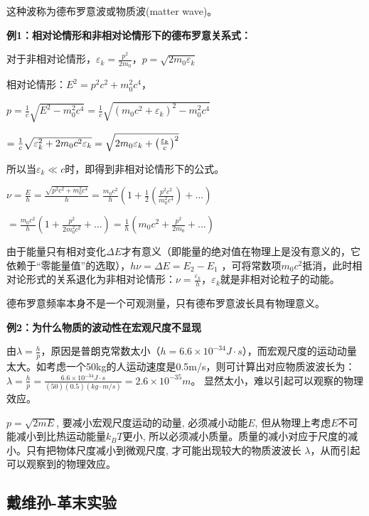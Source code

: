 这种波称为德布罗意波或物质波(matter wave)。

\textbf{例1：相对论情形和非相对论情形下的德布罗意关系式：}

对于非相对论情形，$\varepsilon _k  = \frac{{p^2 }}{{2m_0 }}$，$p = \sqrt {2m_0 \varepsilon _k } $

相对论情形：$E^2  = p^2 c^2  + m_0 ^2 c^4 $，


$p = \frac{1}{c}\sqrt {E^2  - m_0 ^2 c^4 }  = \frac{1}{c}\sqrt
{\left( {m_0 c^2  + \varepsilon _k } \right)^2  - m_0 ^2 c^4 } $

$ = \frac{1}{c}\sqrt {\varepsilon _k ^2  + 2m_0 c^2 \varepsilon _k }
 = \sqrt {2m_0 \varepsilon _k  + \left( {{\textstyle{{\varepsilon
_k } \over c}}} \right)^2 } $

所以当$\varepsilon _k  \ll c$时，即得到非相对论情形下的公式。

$\nu  = \frac{E}{h} = \frac{{\sqrt {p^2 c^2  + m_0 ^2 c^4 } }}{h} =
\frac{{m_0 c^2 }}{h}\left( {1 + \frac{1}{2}\left( {\frac{{p^2 c^2
}}{{m_0 ^2 c^4 }}} \right) + ...} \right) $

$ = \frac{{m_0 c^2 }}{h}\left( {1 + \frac{{p^2 }}{{2m_0 ^2 c^2 }} +
...} \right) = \frac{1}{h}\left( {m_0 c^2  + \frac{{p^2 }}{{2m_0 }}
+ ...} \right)$

由于能量只有相对变化$\Delta E$才有意义（即能量的绝对值在物理上是没有意义的，它依赖于``零能量值''的选取），$h\nu  = \Delta E = E_2  - E_1 $ ，可将常数项$m_0 c^2 $抵消，此时相对论形式的关系退化为非相对论情形：$\nu  = \frac{{\varepsilon _k }}{h}$，$\varepsilon _k $就是非相对论粒子的动能。

德布罗意频率本身不是一个可观测量，只有德布罗意波长具有物理意义。

\textbf{例2：为什么物质的波动性在宏观尺度不显现}

由$\lambda  = \frac{h}{p}$，原因是普朗克常数太小（$h = 6.6 \times 10^{ - 34} J \cdot s$），而宏观尺度的运动动量太大。如考虑一个50kg的人运动速度是0.5m/s，则可计算出对应物质波波长为：
$\lambda  = \frac{h}{p} = \frac{{6.6 \times 10^{ - 34} J \cdot s}}{{\left( {50} \right)\left( {0.5} \right)\left( {kg \cdot m/s} \right)}} = 2.6 \times 10^{ - 35} m$。
显然太小，难以引起可以观察的物理效应。

$p = \sqrt {2mE} $, 要减小宏观尺度运动的动量, 必须减小动能$E$,
但从物理上考虑$E$不可能减小到比热运动能量$k_B T$更小,
所以必须减小质量。质量的减小对应于尺度的减小。只有把物体尺度减小到微观尺度,
才可能出现较大的物质波波长 $\lambda$，从而引起可以观察到的物理效应。


\subsection{戴维孙-革末实验}


